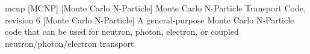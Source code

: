 \newglsXsoftware%
{mcnp}%
[MCNP]%
[Monte Carlo N-Particle]%
{Monte Carlo N-Particle Transport Code, revision 6}%
[Monte Carlo N-Particle]%
{A general-purpose Monte Carlo N-Particle code that can be used for neutron, photon, electron, or coupled neutron/photon/electron transport \cite{website:MCNP}}%